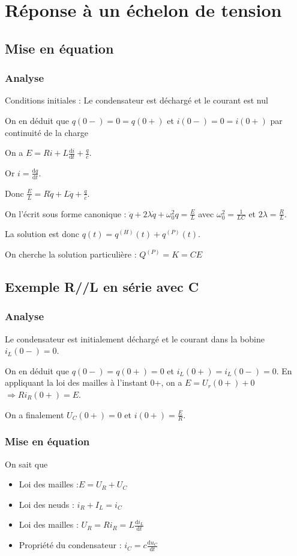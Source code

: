 \documentclass[french]{yLectureNote}
\newcommand{\dd}{\mathrm{d}}
\begin{document}
\section{Réponse à un échelon de tension}
\subsection{Mise en équation}
\subsubsection{Analyse}
Conditions initiales : Le condensateur est déchargé et le courant est nul

On en déduit que \(q(0-) = 0 =q(0+)\) et \(i(0-) = 0 = i(0+)\) par continuité de la charge

On a \(E = R i + L\frac{\dd i}{\dd t} + \frac{q}{c}\).

Or \(i = \frac{\dd q}{\dd t}\).

Donc \(\frac{E}{L} = R\dot{q}+L\ddot{q}+\frac{q}{c}\).

On l'écrit sous forme canonique : \(\ddot{q}+2\lambda \dot{q}+\omega_0^2q = \frac{E}{L}\) avec \(\omega_0^2 = \frac{1}{LC}\) et \(2\lambda = \frac{R}{L}\).


La solution est donc \(q(t) = q^{(H)}(t) + q^{(P)}(t)\).

On cherche la solution particulière : \(Q^{(P)} = K = CE\)

\subsection{Exemple R//L en série avec C}
\subsubsection{Analyse}
Le condensateur est initialement déchargé et le courant dans la bobine \(i_L(0-) = 0\).

On en déduit que \(q(0-) = q(0+) = 0\) et \(i_L(0+) = i_L(0-) = 0\). En appliquant la loi des mailles à l'instant 0+, on a \(E = U_r(0+) + 0\) \( \Rightarrow R i_R(0+) = E\).

On a finalement \(U_C(0+) = 0\) et \(i(0+) = \frac{E}{R}\).

\subsubsection{Mise en équation}
On sait que
\begin{itemize}
 \item Loi des mailles :\(E = U_R+U_C\)
 \item Loi des neuds : \(i_R+I_L=i_C\)
 \item Loi des mailles : \(U_R = R i_R = L\frac{\dd i_L}{\dd t}\)
 \item Propriété du condensateur : \(i_C = c\frac{\dd u_C}{\dd t}\)
\end{itemize}
\end{document}
